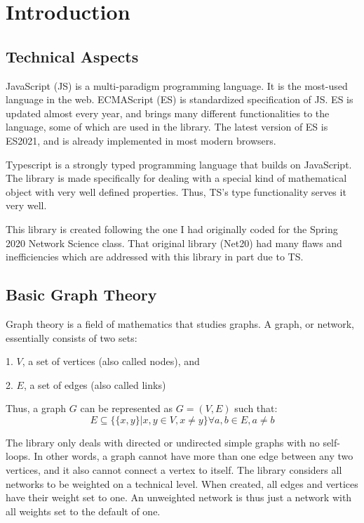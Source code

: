 \chapter{Introduction}

\section{Technical Aspects}

JavaScript (JS) is a multi-paradigm programming language. It is the most-used language in the web. ECMAScript (ES) is standardized specification of JS. ES is updated almost every year, and brings many different functionalities to the language, some of which are used in the library. The latest version of ES is ES2021, and is already implemented in most modern browsers.

Typescript is a strongly typed programming language that builds on JavaScript. The library is made specifically for dealing with a special kind of mathematical object with very well defined properties. Thus, TS's type functionality serves it very well.

This library is created following the one I had originally coded for the Spring 2020 Network Science class. That original library (Net20) had many flaws and inefficiencies which are addressed with this library in part due to TS.

\section{Basic Graph Theory}

Graph theory is a field of mathematics that studies graphs. A graph, or network, essentially consists of two sets:

1. $V$, a set of vertices (also called nodes), and

2. $E$, a set of edges (also called links)

Thus, a graph $G$ can be represented as $G=(V,E)$ such that:
$$E\subseteq \{\{x,y\}|x,y\in V, x\ne y\}\forall a,b \in E, a\ne b$$

The library only deals with directed or undirected simple graphs with no self-loops. In other words, a graph cannot have more than one edge between any two vertices, and it also cannot connect a vertex to itself. The library considers all networks to be weighted on a technical level. When created, all edges and vertices have their weight set to one. An unweighted network is thus just a network with all weights set to the default of one.